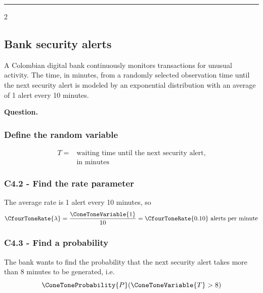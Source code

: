 \noindent\rule{\textwidth}{0.4pt}

\begin{multicols}{2}
	
	\subsection{Bank security alerts}\label{sec:c4-probability-alerts}
	
	A Colombian digital bank continuously monitors transactions for unusual
	activity. The time, in minutes, from a randomly selected observation
	time until the next security alert is modeled by an exponential distribution
	with an average of 1 alert every 10 minutes.
	
	\textbf{Question.}
	\begin{enumerate}
	\end{enumerate}
	
	\subsubsection*{Define the random variable}\label{subsec:c4-probability-alerts-a}
	
	\[
	\boxed{
		\begin{aligned}
			T={}&\text{waiting time until the next security alert,}\\
			&\text{in minutes}
	\end{aligned}}
	\]
	
	\subsubsection*{C4.2 - Find the rate parameter}\label{subsec:c4-probability-alerts-rate}
	
	The average rate is 1 alert every 10 minutes, so
	\[
	\CfourToneRate{\lambda}=\frac{\ConeToneVariable{1}}{10}=\CfourToneRate{0.10}\text{ alerts per minute}
	\]
	
	\columnbreak
	
	\subsubsection*{C4.3 - Find a probability}\label{subsec:c4-probability-alerts-b}
	
	The bank wants to find the probability that the next security alert takes
	more than 8 minutes to be generated, i.e.
	\[
	\ConeToneProbability{P}(\ConeToneVariable{T}>8)
	\]
	

\end{multicols}
